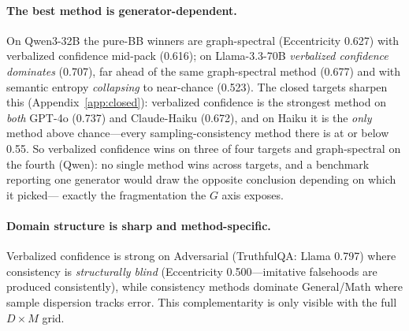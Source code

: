 \documentclass[11pt]{article}
\begin{document}
\paragraph{The best method is generator-dependent.} On Qwen3-32B the pure-BB winners are
graph-spectral (Eccentricity 0.627) with verbalized confidence mid-pack (0.616); on
Llama-3.3-70B \emph{verbalized confidence dominates} (0.707), far ahead of the same
graph-spectral method (0.677) and with semantic entropy \emph{collapsing} to near-chance
(0.523). The closed targets sharpen this (Appendix~\ref{app:closed}): verbalized
confidence is the strongest method on \emph{both} GPT-4o (0.737) and Claude-Haiku (0.672),
and on Haiku it is the \emph{only} method above chance---every sampling-consistency method
there is at or below 0.55. So verbalized confidence wins on three of four targets and
graph-spectral on the fourth (Qwen): no single method wins across targets, and a benchmark
reporting one generator would draw the opposite conclusion depending on which it picked---%
exactly the fragmentation the $G$ axis exposes.

\paragraph{Domain structure is sharp and method-specific.} Verbalized confidence is
strong on Adversarial (TruthfulQA: Llama 0.797) where consistency is
\emph{structurally blind} (Eccentricity 0.500---imitative falsehoods are produced
consistently), while consistency methods dominate General/Math where sample dispersion
tracks error. This complementarity is only visible with the full $D\times M$ grid.
\end{document}
